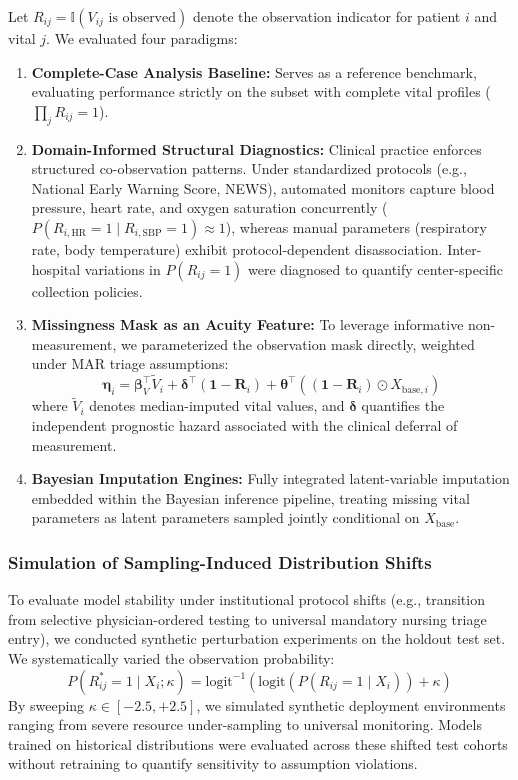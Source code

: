 Let $R_{ij} = \mathbb{I}(V_{ij} \text{ is observed})$ denote the observation indicator for patient $i$ and vital $j$. We evaluated four paradigms:
\begin{enumerate}
    \item \textbf{Complete-Case Analysis Baseline:} Serves as a reference benchmark, evaluating performance strictly on the subset with complete vital profiles ($\prod_j R_{ij} = 1$).
    \item \textbf{Domain-Informed Structural Diagnostics:} Clinical practice enforces structured co-observation patterns. Under standardized protocols (e.g., National Early Warning Score, NEWS), automated monitors capture blood pressure, heart rate, and oxygen saturation concurrently ($P(R_{i, \text{HR}} = 1 \mid R_{i, \text{SBP}} = 1) \approx 1$), whereas manual parameters (respiratory rate, body temperature) exhibit protocol-dependent disassociation. Inter-hospital variations in $P(R_{ij} = 1)$ were diagnosed to quantify center-specific collection policies.
    \item \textbf{Missingness Mask as an Acuity Feature:} To leverage informative non-measurement, we parameterized the observation mask directly, weighted under MAR triage assumptions:
    \begin{equation}
        \boldsymbol{\eta}_i = \boldsymbol{\beta}_V^\top \tilde{V}_i + \boldsymbol{\delta}^\top (\mathbf{1} - \mathbf{R}_i) + \boldsymbol{\theta}^\top \left( (\mathbf{1} - \mathbf{R}_i) \odot X_{\text{base}, i} \right)
    \end{equation}
    where $\tilde{V}_i$ denotes median-imputed vital values, and $\boldsymbol{\delta}$ quantifies the independent prognostic hazard associated with the clinical deferral of measurement.
    \item \textbf{Bayesian Imputation Engines:} Fully integrated latent-variable imputation embedded within the Bayesian inference pipeline, treating missing vital parameters as latent parameters sampled jointly conditional on $X_{\text{base}}$.
\end{enumerate}

\subsubsection{Simulation of Sampling-Induced Distribution Shifts}
To evaluate model stability under institutional protocol shifts (e.g., transition from selective physician-ordered testing to universal mandatory nursing triage entry), we conducted synthetic perturbation experiments on the holdout test set. We systematically varied the observation probability:
\begin{equation}
    P(R_{ij}^* = 1 \mid X_i; \kappa) = \text{logit}^{-1}\left( \text{logit}(P(R_{ij} = 1 \mid X_i)) + \kappa \right)
\end{equation}
By sweeping $\kappa \in [-2.5, +2.5]$, we simulated synthetic deployment environments ranging from severe resource under-sampling to universal monitoring. Models trained on historical distributions were evaluated across these shifted test cohorts without retraining to quantify sensitivity to assumption violations.

